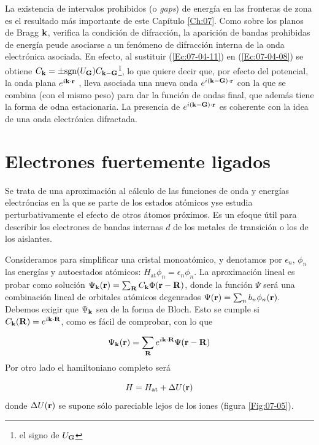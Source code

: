 La existencia de intervalos prohibidos (o \textit{gaps}) de energía en las fronteras de zona es el resultado más importante de este Capítulo \ref{Ch:07}. Como sobre los planos de Bragg $\mathbf{k}$, verifica la condición de difracción, la aparición de bandas prohibidas de energía peude asociarse a un fenómeno de difracción interna de la onda electrónica asociada. En efecto, al sustituir (\ref{Ec:07-04-11}) en (\ref{Ec:07-04-08}) se obtiene $C_{\mathbf{k}} = \pm \text{sgn}(U_{\mathbf{G}}) C_{\mathbf{k}-\mathbf{G}}$\footnote{el signo de $U_{\mathbf{G}}$}, lo que quiere decir que, por efecto del potencial, la onda plana $e^{i \mathbf{k} \cdot \mathbf{r}}$ , lleva asociada una nueva onda $e^{i(\mathbf{k} -\mathbf{G})\cdot \mathbf{r}}$ con la que se combina (con el mismo peso) para dar la función de ondas final, que además tiene la forma de odna estacionaria. La presencia de $e^{i(\mathbf{k} - \mathbf{G})\cdot \mathbf{r}}$ es coherente con la idea de una onda electrónica difractada. 

\section{Electrones fuertemente ligados}

Se trata de una aproximación al cálculo de las funciones de onda y energías electróncias en la que se parte de los estados atómicos yse estudia perturbativamente el efecto de otros átomos próximos. Es un efoque útil para describir los electrones de bandas internas $d$ de los metales de transición o los de los aislantes.

Consideramos para simplificar una cristal monoatómico, y denotamos por $\epsilon_n$, $\phi_n$ las energías y autoestados atómicos: $H_{\text{at}} \phi_n = \epsilon_n \phi_n$. La aproximación lineal es probar como solución $\Psi_{\mathbf{k}} (\mathbf{r}) = \sum_{\mathbf{R}} C_{\mathbf{k}} \Phi  (\mathbf{r} - \mathbf{R})$, donde la función $\Psi$ será una combinación lineal de orbitales atómicos degenrados $\Psi (\mathbf{r}) = \sum_n b_n \phi_n (\mathbf{r})$. Debemos exigir que $\Psi_{\mathbf{k}}$ sea de la forma de Bloch. Esto se cumple si $C_{\mathbf{k}} (\mathbf{R}) = e^{i \mathbf{k} \cdot \mathbf{R}}$, como es fácil de comprobar, con lo que 

\begin{equation}
    \Psi_{\mathbf{k}} (\mathbf{r}) = \sum_{\mathbf{R}} e^{i \mathbf{k} \cdot \mathbf{R}} \Psi (\mathbf{r} - \mathbf{R}) \label{Ec:07-05-01}
\end{equation} 
Por otro lado el hamiltoniano completo será 

\begin{equation}
    H = H_{\text{at}} + \Delta U(\mathbf{r})
\end{equation} 
donde $\Delta U (\mathbf{r})$ se supone sólo pareciable lejos de los iones (figura \ref{Fig:07-05}).

